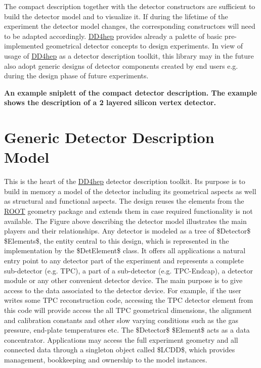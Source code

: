 The compact description together with the detector constructors are sufficient to build the detector model and to visualize it. If during the lifetime of the experiment the detector model changes, the corresponding constructors will need to be adapted accordingly. \hyperlink{namespace_d_d4hep}{D\+D4hep} provides already a palette of basic pre-\/implemented geometrical detector concepts to design experiments. In view of usage of \hyperlink{namespace_d_d4hep}{D\+D4hep} as a detector description toolkit, this library may in the future also adopt generic designs of detector components created by end users e.\+g. during the design phase of future experiments.



{\bfseries An example sniplett of the compact detector description. The example shows the description of a 2 layered silicon vertex detector. }\hypertarget{index_DETDESCMODEL}{}\section{Generic Detector Description Model}\label{index_DETDESCMODEL}
This is the heart of the \hyperlink{namespace_d_d4hep}{D\+D4hep} detector description toolkit. Its purpose is to build in memory a model of the detector including its geometrical aspects as well as structural and functional aspects. The design reuses the elements from the \hyperlink{namespace_r_o_o_t}{R\+O\+OT} geometry package and extends them in case required functionality is not available. The Figure above describing the detector model illustrates the main players and their relationships. Any detector is modeled as a tree of \$\+Detector\$ \$\+Elements\$, the entity central to this design, which is represented in the implementation by the \$\+Det\+Element\$ class. It offers all applications a natural entry point to any detector part of the experiment and represents a complete sub-\/detector (e.\+g. T\+PC), a part of a sub-\/detector (e.\+g. T\+P\+C-\/\+Endcap), a detector module or any other convenient detector device. The main purpose is to give access to the data associated to the detector device. For example, if the user writes some T\+PC reconstruction code, accessing the T\+PC detector element from this code will provide access the all T\+PC geometrical dimensions, the alignment and calibration constants and other slow varying conditions such as the gas pressure, end-\/plate temperatures etc. The \$\+Detector\$ \$\+Element\$ acts as a data concentrator. Applications may access the full experiment geometry and all connected data through a singleton object called \$\+L\+C\+DD\$, which provides management, bookkeeping and ownership to the model instances.


